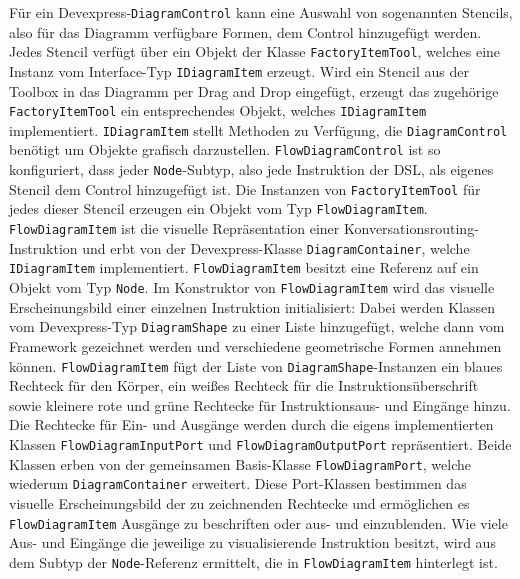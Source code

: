 Für ein Devexpress-\texttt{DiagramControl} kann eine Auswahl von sogenannten Stencils, also für das Diagramm verfügbare Formen, dem Control hinzugefügt werden. Jedes Stencil verfügt über ein Objekt der Klasse \texttt{FactoryItemTool}, welches eine Instanz vom Interface-Typ \texttt{IDiagramItem} erzeugt. Wird ein Stencil aus der Toolbox in das Diagramm per Drag and Drop eingefügt, erzeugt das zugehörige \texttt{FactoryItemTool} ein entsprechendes Objekt, welches \texttt{IDiagramItem} implementiert. \texttt{IDiagramItem} stellt Methoden zu Verfügung, die \texttt{DiagramControl} benötigt um Objekte grafisch darzustellen. \texttt{FlowDiagramControl} ist so konfiguriert, dass jeder \texttt{Node}-Subtyp, also jede Instruktion der DSL, als eigenes Stencil dem Control hinzugefügt ist. Die Instanzen von \texttt{FactoryItemTool} für jedes dieser Stencil erzeugen ein Objekt vom Typ \texttt{FlowDiagramItem}. \texttt{FlowDiagramItem} ist die visuelle Repräsentation einer Konversationsrouting-Instruktion und erbt von der Devexpress-Klasse \texttt{DiagramContainer}, welche \texttt{IDiagramItem} implementiert. \texttt{FlowDiagramItem} besitzt eine Referenz auf ein Objekt vom Typ \texttt{Node}. Im Konstruktor von \texttt{FlowDiagramItem} wird das visuelle Erscheinungsbild einer einzelnen Instruktion initialisiert: Dabei werden Klassen vom Devexpress-Typ \texttt{DiagramShape} zu einer Liste hinzugefügt, welche dann vom Framework gezeichnet werden und verschiedene geometrische Formen annehmen können. \texttt{FlowDiagramItem} fügt der Liste von \texttt{DiagramShape}-Instanzen ein blaues Rechteck für den Körper, ein weißes Rechteck für die Instruktionsüberschrift sowie kleinere rote und grüne Rechtecke für Instruktionsaus- und Eingänge hinzu. Die Rechtecke für Ein- und Ausgänge werden durch die eigens implementierten Klassen \texttt{FlowDiagramInputPort} und \texttt{FlowDiagramOutputPort} repräsentiert. Beide Klassen erben von der gemeinsamen Basis-Klasse \texttt{FlowDiagramPort}, welche wiederum \texttt{DiagramContainer} erweitert. Diese Port-Klassen bestimmen das visuelle Erscheinungsbild der zu zeichnenden Rechtecke und ermöglichen es \texttt{FlowDiagramItem} Ausgänge zu beschriften oder aus- und einzublenden. Wie viele Aus- und Eingänge die jeweilige zu visualisierende Instruktion besitzt, wird aus dem Subtyp der \texttt{Node}-Referenz ermittelt, die in \texttt{FlowDiagramItem} hinterlegt ist.
\newline
